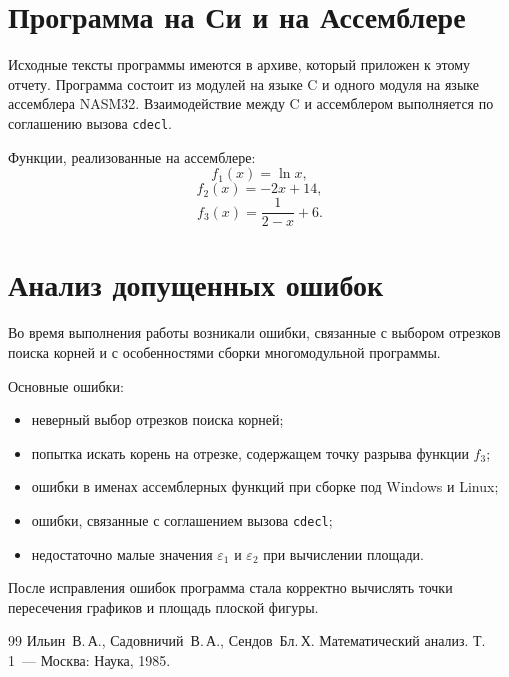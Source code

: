 \documentclass[a4paper,12pt,titlepage,final]{article}
\begin{document}
\newpage

\section{Программа на Си и на Ассемблере}

Исходные тексты программы имеются в архиве, который приложен к этому отчету. Программа состоит из модулей на языке C и одного модуля на языке ассемблера NASM32. Взаимодействие между C и ассемблером выполняется по соглашению вызова \texttt{cdecl}.

Функции, реализованные на ассемблере:
\[
    f_1(x)=\ln x,
\]
\[
    f_2(x)=-2x+14,
\]
\[
    f_3(x)=\frac{1}{2-x}+6.
\]

\newpage

\section{Анализ допущенных ошибок}

Во время выполнения работы возникали ошибки, связанные с выбором отрезков поиска корней и с особенностями сборки многомодульной программы.

Основные ошибки:
\begin{itemize}
    \item неверный выбор отрезков поиска корней;
    \item попытка искать корень на отрезке, содержащем точку разрыва функции $f_3$;
    \item ошибки в именах ассемблерных функций при сборке под Windows и Linux;
    \item ошибки, связанные с соглашением вызова \texttt{cdecl};
    \item недостаточно малые значения $\varepsilon_1$ и $\varepsilon_2$ при вычислении площади.
\end{itemize}

После исправления ошибок программа стала корректно вычислять точки пересечения графиков и площадь плоской фигуры.

\newpage

\begin{raggedright}
\begin{thebibliography}{99}
 Ильин~В.\,А., Садовничий~В.\,А., Сендов~Бл.\,Х. Математический анализ. Т.\,1~---
Москва: Наука, 1985.
\end{thebibliography}
\end{raggedright}
\end{document}
